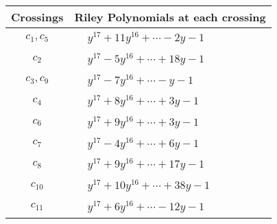 \documentclass[1p]{elsarticle_modified}
\theoremstyle{definition}
\begin{document}
\begin{tabular}{m{50pt}|m{274pt}}
Crossings & \hspace{64pt}Riley Polynomials at each crossing \\
\hline $$\begin{aligned}c_{1},c_{5}\end{aligned}$$&$\begin{aligned}
&y^{17}+11 y^{16}+\cdots-2 y-1
\end{aligned}$\\
\hline $$\begin{aligned}c_{2}\end{aligned}$$&$\begin{aligned}
&y^{17}-5 y^{16}+\cdots+18 y-1
\end{aligned}$\\
\hline $$\begin{aligned}c_{3},c_{9}\end{aligned}$$&$\begin{aligned}
&y^{17}-7 y^{16}+\cdots- y-1
\end{aligned}$\\
\hline $$\begin{aligned}c_{4}\end{aligned}$$&$\begin{aligned}
&y^{17}+8 y^{16}+\cdots+3 y-1
\end{aligned}$\\
\hline $$\begin{aligned}c_{6}\end{aligned}$$&$\begin{aligned}
&y^{17}+9 y^{16}+\cdots+3 y-1
\end{aligned}$\\
\hline $$\begin{aligned}c_{7}\end{aligned}$$&$\begin{aligned}
&y^{17}-4 y^{16}+\cdots+6 y-1
\end{aligned}$\\
\hline $$\begin{aligned}c_{8}\end{aligned}$$&$\begin{aligned}
&y^{17}+9 y^{16}+\cdots+17 y-1
\end{aligned}$\\
\hline $$\begin{aligned}c_{10}\end{aligned}$$&$\begin{aligned}
&y^{17}+10 y^{16}+\cdots+38 y-1
\end{aligned}$\\
\hline $$\begin{aligned}c_{11}\end{aligned}$$&$\begin{aligned}
&y^{17}+6 y^{16}+\cdots-12 y-1
\end{aligned}$\\
\hline
\end{tabular}\\~\\
\end{document}
